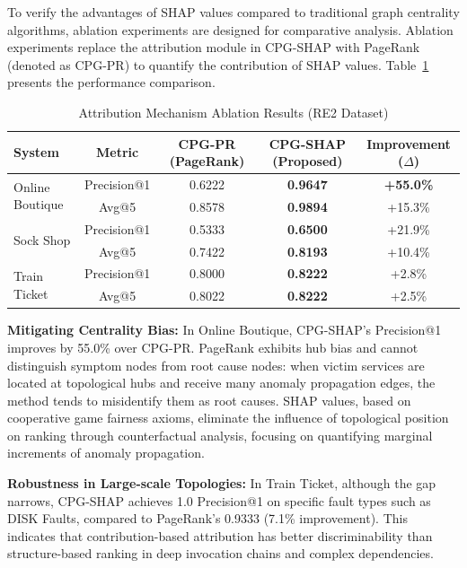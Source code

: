 \documentclass[conference]{IEEEtran}
\begin{document}
To verify the advantages of SHAP values compared to traditional graph centrality algorithms, ablation experiments are designed for comparative analysis. Ablation experiments replace the attribution module in CPG-SHAP with PageRank (denoted as CPG-PR) to quantify the contribution of SHAP values. Table~\ref{tab:attribution_ablation} presents the performance comparison.

\begin{table}[t]
    \centering
    \caption{Attribution Mechanism Ablation Results (RE2 Dataset)}
    \label{tab:attribution_ablation}
    \footnotesize
    \begin{tabular}{lcccc}
        \toprule
        \textbf{System} & \textbf{Metric} & \textbf{CPG-PR (PageRank)} & \textbf{CPG-SHAP (Proposed)} & \textbf{Improvement ($\Delta$)} \\
        \midrule
        \multirow{2}{*}{Online Boutique} & Precision@1 & 0.6222 & \textbf{0.9647} & \textbf{+55.0\%} \\
        & Avg@5 & 0.8578 & \textbf{0.9894} & +15.3\% \\
        \midrule
        \multirow{2}{*}{Sock Shop} & Precision@1 & 0.5333 & \textbf{0.6500} & +21.9\% \\
        & Avg@5 & 0.7422 & \textbf{0.8193} & +10.4\% \\
        \midrule
        \multirow{2}{*}{Train Ticket} & Precision@1 & 0.8000 & \textbf{0.8222} & +2.8\% \\
        & Avg@5 & 0.8022 & \textbf{0.8222} & +2.5\% \\
        \bottomrule
    \end{tabular}
\end{table}

\textbf{Mitigating Centrality Bias:} In Online Boutique, CPG-SHAP's Precision@1 improves by 55.0\% over CPG-PR. PageRank exhibits hub bias and cannot distinguish symptom nodes from root cause nodes: when victim services are located at topological hubs and receive many anomaly propagation edges, the method tends to misidentify them as root causes. SHAP values, based on cooperative game fairness axioms, eliminate the influence of topological position on ranking through counterfactual analysis, focusing on quantifying marginal increments of anomaly propagation.

\textbf{Robustness in Large-scale Topologies:} In Train Ticket, although the gap narrows, CPG-SHAP achieves 1.0 Precision@1 on specific fault types such as DISK Faults, compared to PageRank's 0.9333 (7.1\% improvement). This indicates that contribution-based attribution has better discriminability than structure-based ranking in deep invocation chains and complex dependencies.
\end{document}
